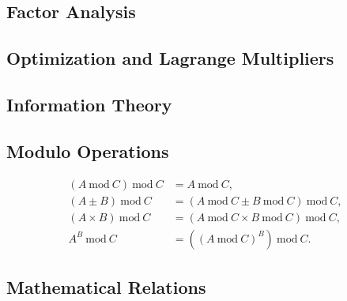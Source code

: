 \subsection{Factor Analysis}
\label{additional:misc:factor_ana}

\subsection{Optimization and Lagrange Multipliers}
\label{additional:misc:opt}

\subsection{Information Theory}
\label{additional:misc:info_theory}

\subsection{Modulo Operations}
\label{additional:misc:modulo}

\begin{subequations}\label{eq:additional:misc:modulo}
\begin{align}
\left(A~\text{mod}~C\right)~\text{mod}~C &= A~\text{mod}~C, \label{eq:misc:additional:modulo:basic} \\
\left(A \pm B\right)~\text{mod}~C &= \left(A~\text{mod}~C \pm B~\text{mod}~C\right)~\text{mod}~C, \label{eq:misc:additional:modulo:pm} \\
\left(A \times B\right)~\text{mod}~C &= \left(A~\text{mod}~C \times B~\text{mod}~C\right)~\text{mod}~C, \label{eq:misc:additional:modulo:multiplication} \\
A^{B}~\text{mod}~C &= \left(\left(A~\text{mod}~C\right)^{B}\right)~\text{mod}~C. \label{eq:misc:additional:modulo:exp}
\end{align}
\end{subequations}

\subsection{Mathematical Relations}
\label{additional:misc:math}

